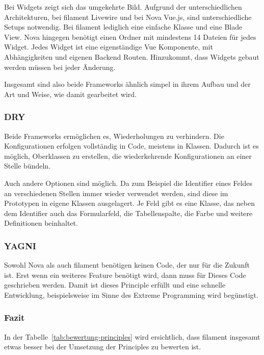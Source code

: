 Bei Widgets zeigt sich das umgekehrte Bild.
Aufgrund der unterschiedlichen Architekturen, bei filament Livewire und bei Nova Vue.js, sind unterschiedliche Setups notwendig.
Bei filament lediglich eine einfache Klasse und eine Blade View.
Nova hingegen benötigt einen Ordner mit mindestens 14 Dateien für jedes Widget.
Jedes Widget ist eine eigenständige Vue Komponente, mit Abhängigkeiten und eigenen Backend Routen.
Hinzukommt, dass Widgets gebaut werden müssen bei jeder Änderung.

Insgesamt sind also beide Frameworks ähnlich simpel in ihrem Aufbau und der Art und Weise, wie damit gearbeitet wird.

\subsubsection{DRY}
Beide Frameworks ermöglichen es, Wiederholungen zu verhindern.
Die Konfigurationen erfolgen vollständig in Code, meistens in Klassen.
Dadurch ist es möglich, Oberklassen zu erstellen, die wiederkehrende Konfigurationen an einer Stelle bündeln.

Auch andere Optionen sind möglich.
Da zum Beispiel die Identifier eines Feldes an verschiedenen Stellen immer wieder verwendet werden, sind diese im Prototypen in eigene Klassen ausgelagert.
Je Feld gibt es eine Klasse, das neben dem Identifier auch das Formularfeld, die Tabellenspalte, die Farbe und weitere Definitionen beinhaltet.

\subsubsection{YAGNI}
Sowohl Nova als auch filament benötigen keinen Code, der nur für die Zukunft ist.
Erst wenn ein weiteres Feature benötigt wird, dann muss für Dieses Code geschrieben werden.
Damit ist dieses Principle erfüllt und eine schnelle Entwicklung, beispielsweise im Sinne des Extreme Programming wird begünstigt.

\subsubsection{Fazit}
In der Tabelle~\ref{tab:bewertung-principles} wird ersichtlich, dass filament insgesamt etwas besser bei der Umsetzung der Principles zu bewerten ist.

